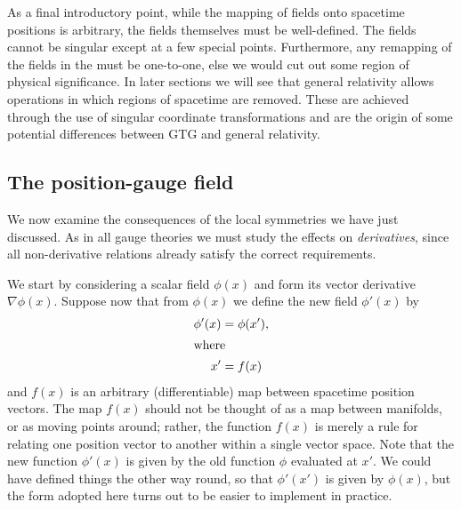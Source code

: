 \documentclass[a4paper]{article}
\numberwithin{equation}{section}
\newcommand{\eqv}{=}
\newcommand{\grad}{\nabla}
\begin{document}
As a final introductory point, while the mapping of fields onto
spacetime positions is arbitrary, the fields themselves must be
well-defined.  The fields cannot be singular except at a few special
points.  Furthermore, any remapping of the fields in the must be
one-to-one, else we would cut out some region of physical
significance.  In later sections we will see that general relativity
allows operations in which regions of spacetime are removed.  These
are achieved through the use of singular coordinate transformations
and are the origin of some potential differences between GTG and general
relativity.



\subsection{The position-gauge field}

We now examine the consequences of the local symmetries we have just
discussed.  As in all gauge theories we must study the effects on
\textit{derivatives}, since all non-derivative relations already
satisfy the correct requirements.  


We start by considering a scalar field $\phi(x)$ and form its vector
derivative $\grad \phi(x)$.  Suppose now that from $\phi(x)$ we define
the new field $\phi'(x)$ by
%
\begin{align}
\phi'(x) &\eqv \phi(x'), \\
%
\intertext{where}
%
x' &= f(x)
\end{align}
%
and $f(x)$ is an arbitrary (differentiable) map between spacetime
position vectors.  The map $f(x)$ should not be thought of as a map
between manifolds, or as moving points around; rather, the function
$f(x)$ is merely a rule for relating one position vector to another
within a single vector space.  Note that the new function $\phi'(x)$
is given by the old function $\phi$ evaluated at $x'$.  We could have
defined things the other way round, so that $\phi'(x')$ is given by
$\phi(x)$, but the form adopted here turns out to be easier to
implement in practice.
\end{document}
